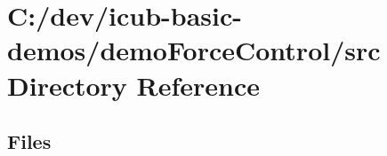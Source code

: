 \section{C\+:/dev/icub-\/basic-\/demos/demo\+Force\+Control/src Directory Reference}
\label{dir_16f69bce6b508aa996db90e545a71f98}
\subsection*{Files}
\begin{DoxyCompactItemize}
\end{DoxyCompactItemize}
